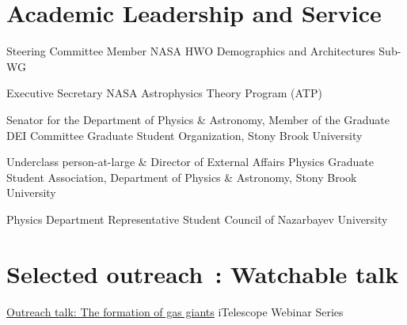 \documentclass[10pt]{article} %
\begin{document}
\begin{paracol}{1}
\section{Academic Leadership and Service}





	
	{Steering Committee Member}
	{NASA HWO Demographics and Architectures Sub-WG}

	{Executive Secretary}
	{NASA Astrophysics Theory Program (ATP)}

	{Senator for the Department of Physics \& Astronomy, Member of the Graduate DEI Committee}
	{Graduate Student Organization, Stony Brook University}
	
	{Underclass person-at-large \& Director of External Affairs}
	{Physics Graduate Student Association, Department of Physics \& Astronomy, Stony Brook University}
	
	
	{Physics Department Representative}
	{Student Council of Nazarbayev University}
	
\section{Selected outreach \footnotesize {\faVideoCamera}\,: Watchable talk \phantom{XX.}}

	{\href{https://www.youtube.com/watch?v=w7dNKDIJ9DM}{Outreach talk: The formation of gas giants} \faVideoCamera}
	{iTelescope Webinar Series}


\end{paracol}
\end{document}
